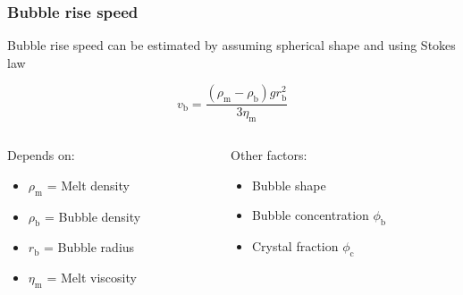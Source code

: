 \documentclass{beamer}
\begin{document}
\begin{frame}
  \frametitle{Bubble rise speed}

  Bubble rise speed can be estimated by assuming spherical shape and using Stokes law

  $$ v_{\text{b}} = \frac{(\rho_{\text{m}} - \rho_{\text{b}}) g r_{\text{b}}^{2}}{3 \eta_{\text{m}}}$$

  \begin{columns}[t]

    \begin{column}{0.5\paperwidth}

      Depends on:
      \begin{itemize}
      \item $\rho_{\text{m}}$ = Melt density \\
      \item $\rho_{\text{b}}$ = Bubble density \\
      \item $r_{\text{b}}$ = Bubble radius \\
      \item $\eta_{\text{m}}$ = Melt viscosity \\
      \end{itemize}

    \end{column}

    \begin{column}{0.5\paperwidth}

      Other factors:
      \begin{itemize}
      \item Bubble shape \\
      \item Bubble concentration $\phi_{\text{b}}$ \\
      \item Crystal fraction $\phi_{\text{c}}$ \\
      \end{itemize}

    \end{column}

  \end{columns}
  
\end{frame}
\end{document}
